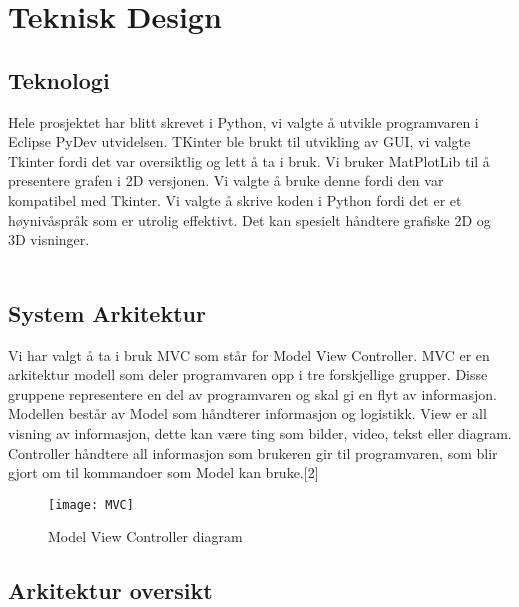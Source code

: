 \chapter{Teknisk Design}
\label{chap:technical}


\section{Teknologi}
Hele prosjektet har blitt skrevet i Python, vi valgte å utvikle programvaren i Eclipse PyDev utvidelsen. TKinter ble brukt til utvikling av GUI, vi valgte Tkinter fordi det var oversiktlig og lett å ta i bruk. Vi bruker MatPlotLib til å presentere grafen i 2D versjonen. Vi valgte å bruke denne fordi den var kompatibel med Tkinter. Vi valgte å skrive koden i Python fordi det er et høynivåspråk som er utrolig effektivt. Det kan spesielt håndtere grafiske 2D og 3D visninger. \\ \\

\section{System Arkitektur}
Vi har valgt å ta i bruk MVC som står for Model View Controller. MVC er en arkitektur modell som deler programvaren opp i tre forskjellige grupper. Disse gruppene representere en del av programvaren og skal gi en flyt av informasjon. Modellen består av Model som håndterer informasjon og logistikk.  View er all visning av informasjon, dette kan være ting som bilder, video, tekst eller diagram. Controller håndtere all informasjon som brukeren gir til programvaren, som blir gjort om til kommandoer som Model kan bruke.[2]

\begin{figure}[h]
    \centering
    \texttt{[image: MVC]}
    \caption{Model View Controller diagram}
    \label{fig:my_label}
\end{figure}




\section{Arkitektur oversikt}
